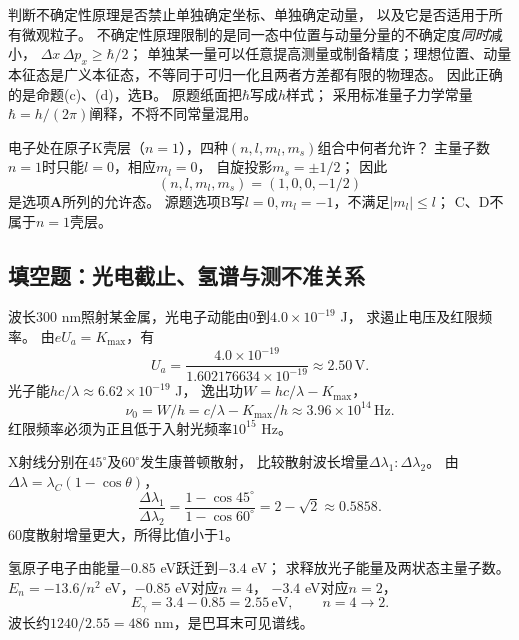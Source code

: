 \problemtext 判断不确定性原理是否禁止单独确定坐标、单独确定动量，
以及它是否适用于所有微观粒子。
\workings
不确定性原理限制的是同一态中位置与动量分量的不确定度\emph{同时}减小，
$\Delta x\,\Delta p_x\ge\hbar/2$；
单独某一量可以任意提高测量或制备精度；理想位置、动量本征态是广义本征态，不等同于可归一化且两者方差都有限的物理态。
因此正确的是命题(c)、(d)，选\textbf{B}。
\crosscheck 原题纸面把$\hbar$写成$h$样式；
采用标准量子力学常量$\hbar=h/(2\pi)$阐释，不将不同常量混用。

\problemtext 电子处在原子K壳层（$n=1$），四种$(n,l,m_l,m_s)$组合中何者允许？
\workings
主量子数$n=1$时只能$l=0$，相应$m_l=0$，
自旋投影$m_s=\pm1/2$；
因此
\[
\boxed{(n,l,m_l,m_s)=(1,0,0,-1/2)}
\]
是选项\textbf{A}所列的允许态。
\crosscheck 源题选项B写$l=0,m_l=-1$，不满足$|m_l|\le l$；
C、D不属于$n=1$壳层。

\subsection{填空题：光电截止、氢谱与测不准关系}

\problemtext 波长300 nm照射某金属，光电子动能由0到$4.0\times10^{-19}$ J，
求遏止电压及红限频率。
\workings
由$eU_a=K_{\max}$，有
\[
\boxed{U_a=\frac{4.0\times10^{-19}}{1.602176634\times10^{-19}}
\approx2.50\,\mathrm V}.
\]
光子能$hc/\lambda\approx6.62\times10^{-19}$ J，
逸出功$W=hc/\lambda-K_{\max}$，
\[
\boxed{\nu_0=W/h
=c/\lambda-K_{\max}/h\approx3.96\times10^{14}\,\mathrm{Hz}}.
\]
\crosscheck 红限频率必须为正且低于入射光频率$10^{15}$ Hz。

\problemtext X射线分别在$45^\circ$及$60^\circ$发生康普顿散射，
比较散射波长增量$\Delta\lambda_1:\Delta\lambda_2$。
\workings
由$\Delta\lambda=\lambda_C(1-\cos\theta)$，
\[
\boxed{\frac{\Delta\lambda_1}{\Delta\lambda_2}
=\frac{1-\cos45^\circ}{1-\cos60^\circ}
=2-\sqrt2\approx0.5858}.
\]
\crosscheck 60度散射增量更大，所得比值小于1。

\problemtext 氢原子电子由能量$-0.85$ eV跃迁到$-3.4$ eV；
求释放光子能量及两状态主量子数。
\workings
$E_n=-13.6/n^2$ eV，$-0.85$ eV对应$n=4$，
$-3.4$ eV对应$n=2$，
\[
\boxed{E_\gamma=3.4-0.85=2.55\,\mathrm{eV}},
\qquad \boxed{n=4\to2}.
\]
\crosscheck 波长约$1240/2.55=486$ nm，是巴耳末可见谱线。


